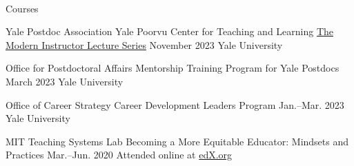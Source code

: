 \\



Courses

\begin{cventries}

  \cventry
    {Yale Postdoc Association Yale Poorvu Center for Teaching and Learning} %
    {\href{https://ypa.yale.edu/skills-and-career-development/modern-instructor}{The Modern Instructor Lecture Series}} %
    {November 2023} %
    {Yale University} %
    {
    }

  \cventry
    {Office for Postdoctoral Affairs} %
    {Mentorship Training Program for Yale Postdocs} %
    {March 2023} %
    {Yale University} %
    {
    }

  \cventry
    {Office of Career Strategy} %
    {Career Development Leaders Program} %
    {Jan.--Mar. 2023} %
    {Yale University} %
    {
    }

  \cventry
    {MIT Teaching Systems Lab} %
    {Becoming a More Equitable Educator: Mindsets and Practices} %
    {Mar.--Jun. 2020} %
    {Attended online at \href{www.edx.org}{edX.org}} %
    {
    }


\end{cventries}
